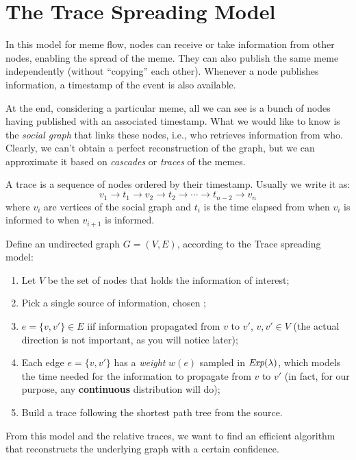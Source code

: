 \section{The Trace Spreading Model}

In this model for meme flow, nodes can receive or take information from other nodes, enabling the spread of the meme. They can also publish the same meme independently (without ``copying'' each other). Whenever a node publishes information, a timestamp of the event is also available.

At the end, considering a particular meme, all we can see is a bunch of nodes having published with an associated timestamp. What we would like to know is the \emph{social graph} that links these nodes, i.e., who retrieves information from who. Clearly, we can't obtain a perfect reconstruction of the graph, but we can approximate it based on \textit{cascades} or \textit{traces} of the memes.

\begin{defn}[Trace]
    A trace is a sequence of nodes ordered by their timestamp. Usually we write it as:
    \[
        v_1 \to t_1 \to v_2 \to t_2 \to \cdots \to t_{n - 2} \to v_n
    \]
    where $v_i$ are vertices of the social graph and $t_i$ is the time elapsed from when $v_i$ is informed to when $v_{i + 1}$ is informed.
\end{defn}

Define an undirected graph $G = (V, E)$, according to the Trace spreading model: \label{trace-spreading}
\begin{enumerate}
    \item Let $V$ be the set of nodes that holds the information of interest;
    \item Pick a single source of information, chosen \uar;
    \item $e = \{v, v'\} \in E$ iif information propagated from $v$ to $v'$, $v, v' \in V$ (the actual direction is not important, as you will notice later);
    \item Each edge $e = \{v, v'\}$ has a \emph{weight} $w(e)$ sampled \iid{} in $\emph{Exp}(\lambda)$, which models the time needed for the information to propagate from $v$ to $v'$ (in fact, for our purpose, any \textbf{continuous} distribution will do);
    \item Build a trace following the shortest path tree from the source.
\end{enumerate}

From this model and the relative traces, we want to find an efficient algorithm that reconstructs the underlying graph with a certain confidence.

